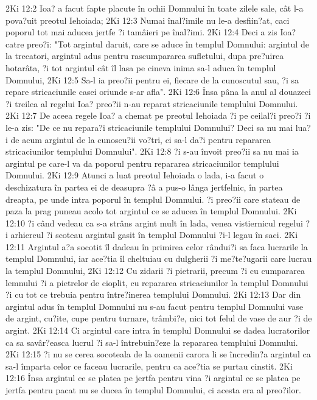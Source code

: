 2Ki 12:2  Ioa? a facut fapte placute în ochii Domnului în toate zilele sale, cât l-a pova?uit preotul Iehoiada;
2Ki 12:3  Numai înal?imile nu le-a desfiin?at, caci poporul tot mai aducea jertfe ?i tamâieri pe înal?imi.
2Ki 12:4  Deci a zis Ioa? catre preo?i: "Tot argintul daruit, care se aduce în templul Domnului: argintul de la trecatori, argintul adus pentru rascumpararea sufletului, dupa pre?uirea hotarâta, ?i tot argintul cât îl lasa pe cineva inima sa-l aduca în templul Domnului,
2Ki 12:5  Sa-l ia preo?ii pentru ei, fiecare de la cunoscutul sau, ?i sa repare stricaciunile casei oriunde s-ar afla".
2Ki 12:6  Însa pâna la anul al douazeci ?i treilea al regelui Ioa? preo?ii n-au reparat stricaciunile templului Domnului.
2Ki 12:7  De aceea regele Ioa? a chemat pe preotul Iehoiada ?i pe ceilal?i preo?i ?i le-a zis: "De ce nu repara?i stricaciunile templului Domnului? Deci sa nu mai lua?i de acum argintul de la cunoscu?ii vo?tri, ci sa-l da?i pentru repararea stricaciunilor templului Domnului".
2Ki 12:8  ?i s-au învoit preo?ii sa nu mai ia argintul pe care-l va da poporul pentru repararea stricaciunilor templului Domnului.
2Ki 12:9  Atunci a luat preotul Iehoiada o lada, i-a facut o deschizatura în partea ei de deasupra ?â a pus-o lânga jertfelnic, în partea dreapta, pe unde intra poporul în templul Domnului. ?i preo?ii care stateau de paza la prag puneau acolo tot argintul ce se aducea în templul Domnului.
2Ki 12:10  ?i când vedeau ca s-a strâns argint mult în lada, venea vistiernicul regelui ?i arhiereul ?i scoteau argintul gasit în templul Domnului ?i-l legau în saci.
2Ki 12:11  Argintul a?a socotit îl dadeau în primirea celor rândui?i sa faca lucrarile la templul Domnului, iar ace?tia îl cheltuiau cu dulgherii ?i me?te?ugarii care lucrau la templul Domnului,
2Ki 12:12  Cu zidarii ?i pietrarii, precum ?i cu cumpararea lemnului ?i a pietrelor de cioplit, cu repararea stricaciunilor la templul Domnului ?i cu tot ce trebuia pentru între?inerea templului Domnului.
2Ki 12:13  Dar din argintul adus în templul Domnului nu s-au facut pentru templul Domnului vase de argint, cu?ite, cupe pentru turnare, trâmbi?e, nici tot felul de vase de aur ?i de argint.
2Ki 12:14  Ci argintul care intra în templul Domnului se dadea lucratorilor ca sa savâr?easca lucrul ?i sa-l întrebuin?eze la repararea templului Domnului.
2Ki 12:15  ?i nu se cerea socoteala de la oamenii carora li se încredin?a argintul ca sa-l împarta celor ce faceau lucrarile, pentru ca ace?tia se purtau cinstit.
2Ki 12:16  Însa argintul ce se platea pe jertfa pentru vina ?i argintul ce se platea pe jertfa pentru pacat nu se ducea în templul Domnului, ci acesta era al preo?ilor.
